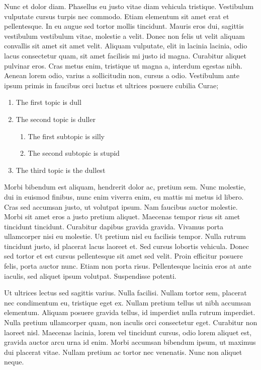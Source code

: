 Nunc et dolor diam. Phasellus eu justo vitae diam vehicula tristique. Vestibulum vulputate cursus turpis nec commodo. Etiam elementum sit amet erat et pellentesque. In eu augue sed tortor mollis tincidunt. Mauris eros dui, sagittis vestibulum vestibulum vitae, molestie a velit. Donec non felis ut velit aliquam convallis sit amet sit amet velit. Aliquam vulputate, elit in lacinia lacinia, odio lacus consectetur quam, sit amet facilisis mi justo id magna. Curabitur aliquet pulvinar eros. Cras metus enim, tristique ut magna a, interdum egestas nibh. Aenean lorem odio, varius a sollicitudin non, cursus a odio. Vestibulum ante ipsum primis in faucibus orci luctus et ultrices posuere cubilia Curae; 
\begin{enumerate}
\item The first topic is dull
\item The second topic is duller
\begin{enumerate}
\item The first subtopic is silly
\item The second subtopic is stupid
\end{enumerate}
\item The third topic is the dullest
\end{enumerate}
Morbi bibendum est aliquam, hendrerit dolor ac, pretium sem. Nunc molestie, dui in euismod finibus, nunc enim viverra enim, eu mattis mi metus id libero. Cras sed accumsan justo, ut volutpat ipsum. Nam faucibus auctor molestie. Morbi sit amet eros a justo pretium aliquet. Maecenas tempor risus sit amet tincidunt tincidunt. Curabitur dapibus gravida gravida. Vivamus porta ullamcorper nisi eu molestie. Ut pretium nisl eu facilisis tempor. Nulla rutrum tincidunt justo, id placerat lacus laoreet et. Sed cursus lobortis vehicula. Donec sed tortor et est cursus pellentesque sit amet sed velit. Proin efficitur posuere felis, porta auctor nunc. Etiam non porta risus. Pellentesque lacinia eros at ante iaculis, sed aliquet ipsum volutpat. Suspendisse potenti.

Ut ultrices lectus sed sagittis varius. Nulla facilisi. Nullam tortor sem, placerat nec condimentum eu, tristique eget ex. Nullam pretium tellus ut nibh accumsan elementum. Aliquam posuere gravida tellus, id imperdiet nulla rutrum imperdiet. Nulla pretium ullamcorper quam, non iaculis orci consectetur eget. Curabitur non laoreet nisl. Maecenas lacinia, lorem vel tincidunt cursus, odio lorem aliquet est, gravida auctor arcu urna id enim. Morbi accumsan bibendum ipsum, ut maximus dui placerat vitae. Nullam pretium ac tortor nec venenatis. Nunc non aliquet neque. 

